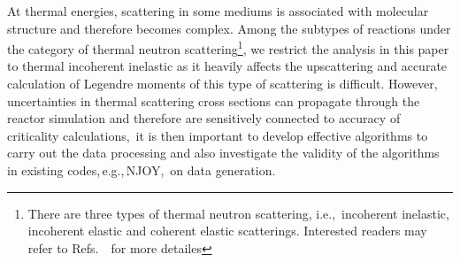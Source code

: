 \documentclass[review]{elsarticle}
\begin{document}
At thermal energies, scattering in some mediums is associated with molecular structure and therefore becomes complex\cite{IKE,Macf,thesis}. Among the subtypes of reactions under the category of thermal neutron scattering\footnote{There are three types of thermal neutron scattering, i.e.,\ incoherent inelastic, incoherent elastic and coherent elastic scatterings. Interested readers may refer to Refs.\ \cite{IKE,njoy2012}\ for more detailes}, we restrict the analysis in this paper to thermal incoherent inelastic as it heavily affects the upscattering and accurate calculation of Legendre moments of this type of scattering is difficult\cite{glasstone}. However, uncertainties in thermal scattering cross sections can propagate through the reactor simulation and therefore are sensitively connected to accuracy of criticality calculations\cite{emulation,Badea,IKE,thesis,weixiong,physor},\ it is then important to develop effective algorithms to carry out the data processing and also investigate the validity of the algorithms in existing codes,\,e.g.,\,NJOY\cite{NJOY},\ on data generation.

\end{document}
